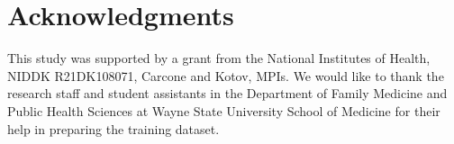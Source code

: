 \documentclass{amia}
\begin{document}
\section*{Acknowledgments}
This study was supported by a grant from the National Institutes of Health, NIDDK R21DK108071, Carcone and Kotov, MPIs. We would like to thank the research staff and student assistants in the Department of Family Medicine and Public Health Sciences at Wayne State University School of Medicine for their help in preparing the training dataset. 



\end{document}
